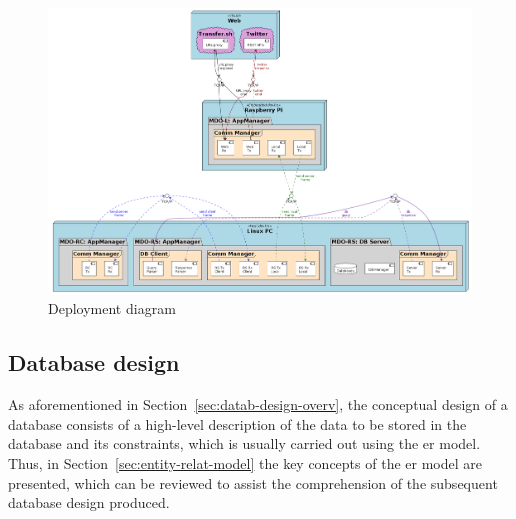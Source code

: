 %
%
\begin{figure}[htb!]
\centering
    \includegraphics[width=1.0\columnwidth]{./img/deploy-diag.png}
  \caption{Deployment diagram}%
\label{fig:deploy-diag}
\end{figure}

\subsection{Database design}
\label{sec:database-design}
As aforementioned in Section~\ref{sec:datab-design-overv}, the conceptual design
of a database consists of a high-level description of the data to be stored in
the database and its constraints, which is usually carried out using the
\gls{er} model. Thus, in Section~\ref{sec:entity-relat-model} the key concepts
of the \gls{er} model are presented, which can be reviewed to assist the
comprehension of the subsequent database design produced.


